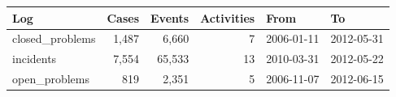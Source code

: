 \begin{tabular}{lrrrll}
\toprule
Log & Cases & Events & Activities & From & To \\
\midrule
closed\_problems & 1,487 & 6,660 & 7 & 2006-01-11 & 2012-05-31 \\
incidents & 7,554 & 65,533 & 13 & 2010-03-31 & 2012-05-22 \\
open\_problems & 819 & 2,351 & 5 & 2006-11-07 & 2012-06-15 \\
\bottomrule
\end{tabular}
